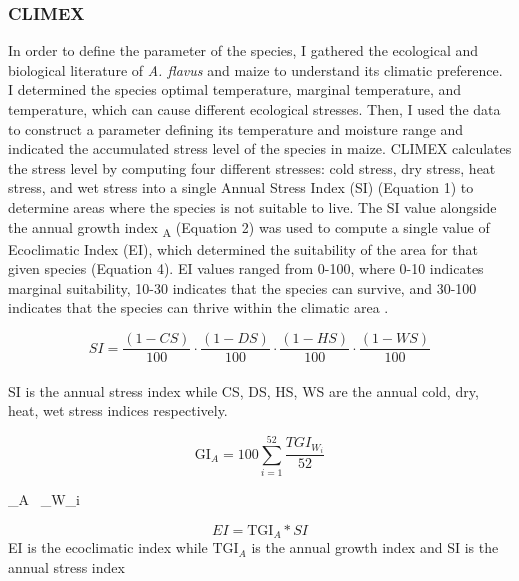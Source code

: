 \subsubsection{CLIMEX}


In order to define the parameter of the species, I gathered the ecological and biological literature of \textit{A. flavus} and maize to understand its climatic preference. I determined the species optimal temperature, marginal temperature, and temperature, which can cause different ecological stresses. Then, I used the data to construct a parameter defining its temperature and moisture range and indicated the accumulated stress level of the species in maize. CLIMEX calculates the stress level by computing four different stresses: cold stress, dry stress, heat stress, and wet stress into a single Annual Stress Index (SI) (Equation 1) to determine areas where the species is not suitable to live. The SI value alongside the annual growth index \textsubscript{A} (Equation 2) was used to compute a single value of Ecoclimatic Index (EI), which determined the suitability of the area for that given species (Equation 4). EI values ranged from 0-100, where 0-10 indicates marginal suitability, 10-30 indicates that the species can survive, and 30-100 indicates that the species can thrive within the climatic area \citep{byeon2018review}.

\begin{equation}
SI = \frac{{(1 - CS)}}{{100}} \cdot \frac{{(1 - DS)}}{{100}} \cdot \frac{{(1 - HS)}}{{100}} \cdot \frac{{(1 - WS)}}{{100}}
\end{equation}
\\
SI is the annual stress index while CS, DS, HS, WS are the annual cold, dry, heat, wet stress indices respectively.

\begin{equation}
    \text{GI}_{A} = 100 \sum_{i=1}^{52} \frac{TGI_{W_i}}{52}
\end{equation}

 _{A}   \
 _{W_i} 

\begin{equation}
    EI = \text{TGI}_{A} * SI
\end{equation}
EI is the ecoclimatic index while $\text{TGI}_{A}$  \textnormal{is the annual growth index } \textnormal{and SI is the annual stress index}

\vspace{\baselineskip} \\

